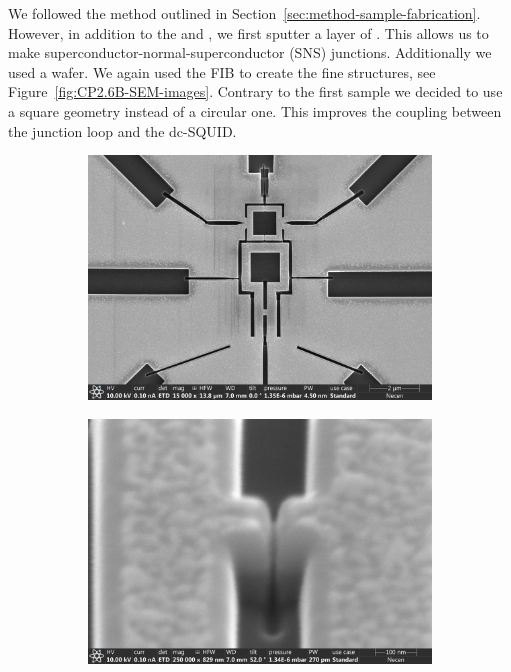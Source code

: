 We followed the method outlined in Section~\ref{sec:method-sample-fabrication}. However, in addition to the  and , we first sputter a layer of . This allows us to make superconductor-normal-superconductor (SNS) junctions. Additionally we used a  wafer. We again used the FIB to create the fine structures, see Figure~\ref{fig:CP2.6B-SEM-images}. Contrary to the first sample we decided to use a square geometry instead of a circular one. This improves the coupling between the junction loop and the dc-SQUID.

\begin{figure}[ht!]
	\begin{subfigure}[t]{0.3\textwidth}
		\centering
		\includegraphics[width=\textwidth]{figures/samples/CP2/CP2.6B_SEM_overview.jpg}
	\end{subfigure}
	\hfill
	\begin{subfigure}[t]{0.3\textwidth}
		\centering
		\includegraphics[width=\textwidth]{figures/samples/CP2/CP2.6B_SEM_junction.jpg}

\end{subfigure}
\end{figure}
